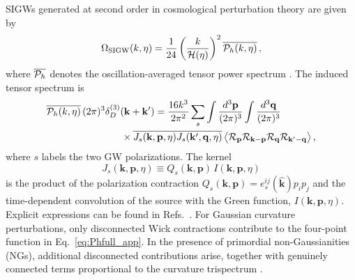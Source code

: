 \documentclass[twocolumn,superscriptaddress,aps,preprintnumbers,amsmath,amssymb,prl,footinbib]{revtex4-2}
\begin{document}
SIGWs generated at second order in cosmological perturbation theory are given by
\cite{Tomita:1975kj,Matarrese:1992rp,Matarrese:1993zf,Matarrese:1997ay,Acquaviva:2002ud,Mollerach:2003nq,Carbone:2004iv,Ananda:2006af,Baumann:2007zm,Espinosa:2018eve,Kohri:2018awv,Domenech:2021ztg}
\begin{equation}
\Omega_{\rm SIGW}(k,\eta)
= \frac{1}{24}
\left(\frac{k}{{\cal H}(\eta)}\right)^2
\overline{{\cal P}_h(k,\eta)} \,,
\label{eq:OmegaGW}
\end{equation}
where $\overline{{\cal P}_h}$ denotes the oscillation-averaged tensor power spectrum \cite{Maggiore:1999vm}.
The induced tensor spectrum is
\begin{align}
\overline{{\cal P}_h(k,\eta)}\,
(2\pi)^3 \delta_D^{(3)}(\mathbf{k}+\mathbf{k}')
&=
\frac{16 k^3}{2\pi^2}
\sum_s
\int \frac{d^3\mathbf{p}}{(2\pi)^3}
\int \frac{d^3\mathbf{q}}{(2\pi)^3}
\nonumber\\
&\hspace{-1.2cm}\times
\overline{
J_s(\mathbf{k},\mathbf{p},\eta)
J_s(\mathbf{k}',\mathbf{q},\eta)
}
\,
\big\langle
\mathcal{R}_{\mathbf{p}}
\mathcal{R}_{\mathbf{k}-\mathbf{p}}
\mathcal{R}_{\mathbf{q}}
\mathcal{R}_{\mathbf{k}'-\mathbf{q}}
\big\rangle \,,
\label{eq:Phfull_app}
\end{align}
where $s$ labels the two GW polarizations.
The kernel
\begin{equation}
J_s(\mathbf{k},\mathbf{p},\eta)
\equiv Q_s(\mathbf{k},\mathbf{p})\, I(\mathbf{k},\mathbf{p},\eta)
\end{equation}
is the product of the polarization contraction
$Q_s(\mathbf{k},\mathbf{p})=e^{ij}_s(\hat{\mathbf{k}})p_ip_j$
and the time-dependent convolution of the source with the Green function,
$I(\mathbf{k},\mathbf{p},\eta)$.
Explicit expressions can be found in
Refs.~\cite{Espinosa:2018eve,Kohri:2018awv,LISACosmologyWorkingGroup:2025vdz}.
For Gaussian curvature perturbations, only disconnected Wick contractions contribute to the four-point function in Eq.~\eqref{eq:Phfull_app}.
In the presence of primordial non-Gaussianities (NGs), additional disconnected contributions arise, together with genuinely connected terms proportional to the curvature trispectrum
\cite{Nakama:2016gzw,Garcia-Bellido:2017aan,Unal:2018yaa,Cai:2018dig,Cai:2019amo,Ragavendra:2020sop,Yuan:2020iwf,Adshead:2021hnm,Davies:2021loj,Abe:2022xur,Garcia-Saenz:2022tzu,Garcia-Saenz:2023zue,Li:2023xtl,Yuan:2023ofl,Perna:2024ehx,Gouttenoire:2025jxe}.
\end{document}
